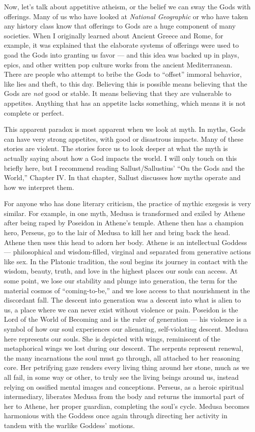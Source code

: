 \documentclass[
]{book}
\begin{document}
Now, let's talk about appetitive atheism, or the belief we can sway the Gods with offerings. Many of us who have looked at \emph{National Geographic} or who have taken any history class know that offerings to Gods are a huge component of many societies. When I originally learned about Ancient Greece and Rome, for example, it was explained that the elaborate systems of offerings were used to goad the Gods into granting us favor --- and this idea was backed up in plays, epics, and other written pop culture works from the ancient Mediterranean. There are people who attempt to bribe the Gods to ``offset'' immoral behavior, like lies and theft, to this day. Believing this is possible means believing that the Gods are \emph{not} good or stable. It means believing that they are vulnerable to appetites. Anything that has an appetite lacks something, which means it is not complete or perfect.

This apparent paradox is most apparent when we look at myth. In myths, Gods can have very strong appetites, with good or disastrous impacts. Many of these stories are violent. The stories force us to look deeper at what the myth is actually saying about how a God impacts the world. I will only touch on this briefly here, but I recommend reading Sallust/Sallustius' ``On the Gods and the World,'' Chapter IV. In that chapter, Sallust discusses how myths operate and how we interpret them.

For anyone who has done literary criticism, the practice of mythic exegesis is very similar. For example, in one myth, Medusa is transformed and exiled by Athene after being raped by Poseidon in Athene's temple. Athene then has a champion hero, Perseus, go to the lair of Medusa to kill her and bring back the head. Athene then uses this head to adorn her body. Athene is an intellectual Goddess --- philosophical and wisdom-filled, virginal and separated from generative actions like sex. In the Platonic tradition, the soul begins its journey in contact with the wisdom, beauty, truth, and love in the highest places our souls can access. At some point, we lose our stability and plunge into generation, the term for the material cosmos of ``coming-to-be,'' and we lose access to that nourishment in the discordant fall. The descent into generation was a descent into what is alien to us, a place where we can never exist without violence or pain. Poseidon is the Lord of the World of Becoming and is the ruler of generation --- his violence is a symbol of how our soul experiences our alienating, self-violating descent. Medusa here represents our souls. She is depicted with wings, reminiscent of the metaphorical wings we lost during our descent. The serpents represent renewal, the many incarnations the soul must go through, all attached to her reasoning core. Her petrifying gaze renders every living thing around her stone, much as we all fail, in some way or other, to truly see the living beings around us, instead relying on ossified mental images and conceptions. Perseus, as a heroic spiritual intermediary, liberates Medusa from the body and returns the immortal part of her to Athene, her proper guardian, completing the soul's cycle. Medusa becomes harmonious with the Goddess once again through directing her activity in tandem with the warlike Goddess' motions.
\end{document}
